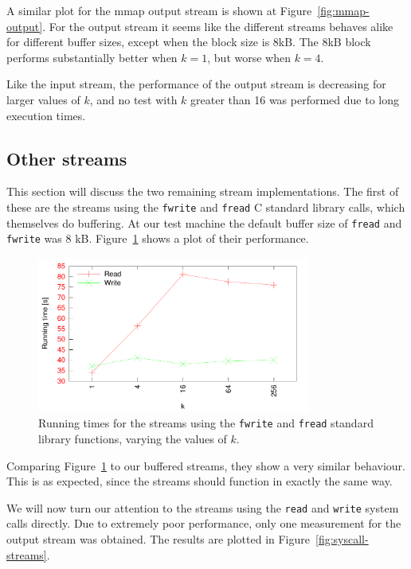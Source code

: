 \documentclass[a4paper,12pt]{article}
\begin{document}
A similar plot for the mmap output stream is shown at
Figure~\ref{fig:mmap-output}. For the output stream it seems like the
different streams behaves alike for different buffer sizes, except
when the block size is 8kB. The 8kB block performs substantially
better when $k = 1$, but worse when $k = 4$.

Like the input stream, the performance of the output stream is
decreasing for larger values of $k$, and no test with $k$ greater than
16 was performed due to long execution times.

\subsection{Other streams}
\label{sec:other-streams}
This section will discuss the two remaining stream
implementations. The first of these are the streams using the
\texttt{fwrite} and \texttt{fread} C standard library calls, which
themselves do buffering. At our test machine the default buffer size
of \texttt{fread} and \texttt{fwrite} was 8
kB. Figure~\ref{fig:fstreams} shows a plot of their performance.

\begin{figure}[h!]
  \centering
  \includegraphics[width=0.8\textwidth]{fstreams}
  \caption{Running times for the streams using the \texttt{fwrite} and
    \texttt{fread} standard library functions, varying the values of
    $k$.}
  \label{fig:fstreams}
\end{figure}

Comparing Figure~\ref{fig:fstreams} to our buffered streams, they show
a very similar behaviour. This is as expected, since the streams
should function in exactly the same way.

We will now turn our attention to the streams using the \texttt{read}
and \texttt{write} system calls directly. Due to extremely poor
performance, only one measurement for the output stream was
obtained. The results are plotted in Figure~\ref{fig:syscall-streams}.
\end{document}
